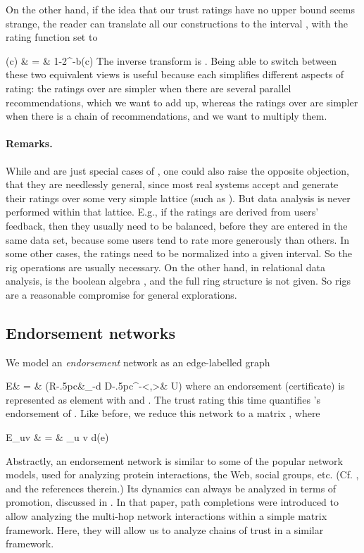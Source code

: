 \documentclass{llncs}
\makeatletter
\newcommand{\truss}[2]{\underset{#2}{\stackrel{#1}{\rightarrow}}}
\newcommand{\Atr}{{\sf U}}
\newcommand{\Rat}{{\sf R}}
\newcommand{\bind}{b}
\newcommand{\bindd}{\beta}
\newcommand{\Del}{{\sf D}}
\newcommand{\del}{d}
\newcommand{\tto}[1]{\xymatrix@C-.5pc{\ar[r]^-{#1}&}}
\newcommand{\oot}[1]{\xymatrix@C-.5pc{&\ar[l]_-{#1}}}
\renewcommand{\Bbb}{\mathbb}
\newcommand{\EEe}{{\Bbb E}}
\newcommand{\bear}{}
\makeatother
\begin{document}
On the other hand, if the idea that our trust ratings have no upper bound seems strange, the reader can translate all our constructions to the interval , with the rating function  set to 
\bear
\bindd(c) & = &  1-2^{-\bind(c)}
\eear
The inverse transform is . Being able to switch between these two equivalent views is useful because each simplifies different aspects of rating: the ratings over  are simpler when there are several parallel recommendations, which we want to add up, whereas the ratings over  are simpler when there is a chain of recommendations, and we want to multiply them. 

\paragraph{Remarks.} While  and  are just special cases of , one could also raise the opposite objection, that they are needlessly general, since most real systems accept and generate their ratings over some very simple lattice (such as ). But data analysis is never performed within that lattice. E.g., if the ratings are derived from users' feedback, then they usually need to be balanced, before they are entered in the same data set, because some users tend to rate more generously than others. In some other cases, the ratings need to be normalized into a given interval. So the rig operations are usually necessary. On the other hand, in relational data analysis,  is the boolean algebra , and the full ring structure is not given. So rigs are a reasonable compromise for general explorations. 

\subsection{Endorsement networks}
We model an {\em endorsement\/} network as an edge-labelled graph 
\bear
\EEe   & = &  \big(\Rat \oot{\del} \Del \tto{<\partial,\varrho>} \Atr\times\Atr \big)
\eear
where an endorsement (certificate)  is represented as element  with  and . The trust rating  this time quantifies 's endorsement of . Like before, we reduce this network to a matrix , where
\bear
E_{uv} & = & \sum_{u\truss{e}{} v} \del(e)
\eear

Abstractly, an endorsement network is similar to some of the popular network models, used for analyzing  protein interactions, the Web, social groups, etc. (Cf. \cite{Langville06google-book,Newman:networks-book}, and the references therein.) Its dynamics can always be analyzed in terms of promotion, discussed in \cite{PavlovicD:CSR08}. In that paper, path completions were introduced to allow analyzing the multi-hop network interactions within a simple matrix framework. Here, they will allow us to analyze chains of trust in a similar framework. 
\end{document}
